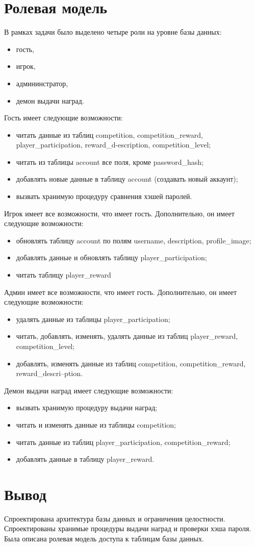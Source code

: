 \section{Ролевая модель}
В рамках задачи было выделено четыре роли на уровне базы данных:
\begin{itemize}
	\item гость,
	\item игрок,
	\item админинстратор,
	\item демон выдачи наград.
\end{itemize}
Гость имеет следующие возможности:
\begin{itemize}
	\item читать данные из таблиц competition, competition\_reward, player\_participation, reward\_d-escription, competition\_level;
	\item читать из таблицы account все поля, кроме password\_hash;
	\item добавлять новые данные в таблицу account (создавать новый аккаунт);
	\item вызвать хранимую процедуру сравнения хэшей паролей.
\end{itemize}
Игрок имеет все возможности, что имеет гость. Дополнительно, он имеет следующие возможности:
\begin{itemize}
	\item обновлять таблицу account по полям username, description, profile\_image;
	\item добавлять данные и обновлять таблицу player\_participation;
	\item читать таблицу player\_reward
\end{itemize}
Админ имеет все возможности, что имеет гость. Дополнительно, он имеет следующие возможности:
\begin{itemize}
	\item удалять данные из таблицы player\_participation;
	\item читать, добавлять, изменять, удалять данные из таблиц player\_reward, competition\_level;
	\item добавлять, изменять данные из таблиц competition, competition\_reward, reward\_descri--ption.
\end{itemize}
Демон выдачи наград имеет следующие возможности:
\begin{itemize}
	\item вызвать хранимую процедуру выдачи наград;
	\item читать и изменять данные из таблицы competition;
	\item читать данные из таблиц player\_participation, competition\_reward;
	\item добавлять данные в таблицу player\_reward.
\end{itemize}


\section*{Вывод}

Спроектирована архитектура базы данных и ограничения целостности. Спроектированы хранимые процедуры выдачи наград и проверки хэша пароля. Была описана ролевая модель доступа к таблицам базы данных.
\clearpage

